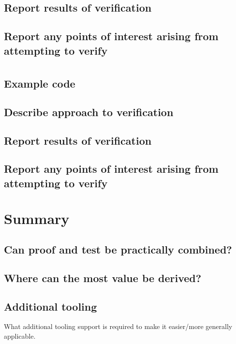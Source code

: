 \documentclass{llncs}
\begin{document}
\subsection{Report results of verification}
\subsection{Report any points of interest arising from attempting to verify}



\section{}
\subsection{Example code}
\subsection{Describe approach to verification}
\subsection{Report results of verification}
\subsection{Report any points of interest arising from attempting to verify}

\section{Summary}

\subsection{Can proof and test be practically combined?}

\subsection{Where can the most value be derived?}

\subsection{Additional tooling}
What additional tooling support is required to make it easier/more
generally applicable.




\end{document}
